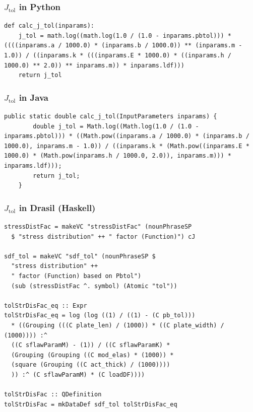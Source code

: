 \documentclass{beamer}
\begin{document}
\begin{frame}

\frametitle{$J_{\mbox{tol}}$ in Python}

\begin{lstlisting}
def calc_j_tol(inparams):
    j_tol = math.log((math.log(1.0 / (1.0 - inparams.pbtol))) * ((((inparams.a / 1000.0) * (inparams.b / 1000.0)) ** (inparams.m - 1.0)) / ((inparams.k * (((inparams.E * 1000.0) * ((inparams.h / 1000.0) ** 2.0)) ** inparams.m)) * inparams.ldf)))
    return j_tol
\end{lstlisting}
\end{frame}


\begin{frame}

\frametitle{$J_{\mbox{tol}}$ in Java}

\begin{lstlisting}
public static double calc_j_tol(InputParameters inparams) {
        double j_tol = Math.log((Math.log(1.0 / (1.0 - inparams.pbtol))) * ((Math.pow((inparams.a / 1000.0) * (inparams.b / 1000.0), inparams.m - 1.0)) / ((inparams.k * (Math.pow((inparams.E * 1000.0) * (Math.pow(inparams.h / 1000.0, 2.0)), inparams.m))) * inparams.ldf)));
        return j_tol;
    }
\end{lstlisting}
\end{frame}


\begin{frame}

\frametitle{$J_{\mbox{tol}}$ in Drasil (Haskell)}

\begin{lstlisting}
stressDistFac = makeVC "stressDistFac" (nounPhraseSP 
  $ "stress distribution" ++ " factor (Function)") cJ

sdf_tol = makeVC "sdf_tol" (nounPhraseSP $ 
  "stress distribution" ++
  " factor (Function) based on Pbtol") 
  (sub (stressDistFac ^. symbol) (Atomic "tol"))

tolStrDisFac_eq :: Expr
tolStrDisFac_eq = log (log ((1) / ((1) - (C pb_tol)))
  * ((Grouping (((C plate_len) / (1000)) * ((C plate_width) / (1000)))) :^
  ((C sflawParamM) - (1)) / ((C sflawParamK) *
  (Grouping (Grouping ((C mod_elas) * (1000)) *
  (square (Grouping ((C act_thick) / (1000))))
  )) :^ (C sflawParamM) * (C loadDF))))

tolStrDisFac :: QDefinition
tolStrDisFac = mkDataDef sdf_tol tolStrDisFac_eq
\end{lstlisting}
\end{frame}
\end{document}

